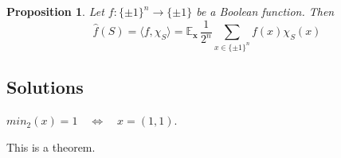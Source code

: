 \documentclass[11pt]{article}
\numberwithin{equation}{section}
\newtheorem{prop}[thm]{Proposition}
\theoremstyle{definition}
\newenvironment{sol}[1]{%
  \renewcommand\thesolinner{#1}%
  \solinner
}{\endsolinner}
\begin{document}
\begin{prop}\label{fourier_coef}
Let $f:\{\pm 1\}^n \to \{\pm 1\}$ be a Boolean function. Then
	$$\hat{f}(S) = \langle f, \chi_S \rangle = \mathbb{E}_{\bm{x} ~ } \frac{1}{2^n} \sum_{x \in \{\pm 1\}^n} f(x) \chi_S(x)$$
\end{prop}

\clearpage

\subsection{Solutions}

\begin{sol}{1.1(a)}\label{1.1(a)}
	$min_2(x) = 1 \quad \iff \quad x = (1, 1)$. 
\end{sol}


\begin{sol}{A}[title]\label{baz}
This is a theorem.
\end{sol}


\clearpage



\end{document}
